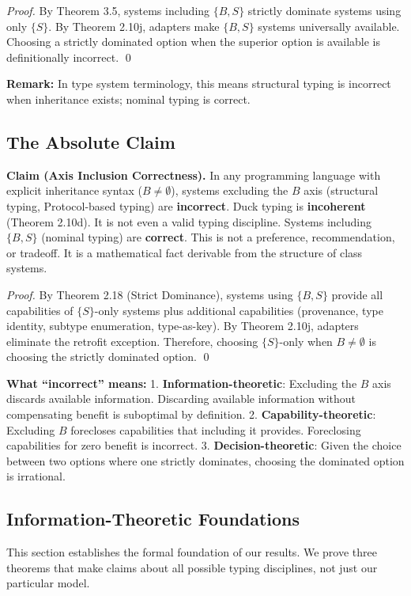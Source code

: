 \emph{Proof.} By Theorem 3.5, systems including $\{B, S\}$ strictly dominate
systems using only $\{S\}$. By Theorem 2.10j, adapters make $\{B, S\}$ systems
universally available. Choosing a strictly dominated option when the
superior option is available is definitionally incorrect.
\qed

\textbf{Remark:} In type system terminology, this means structural typing is incorrect when inheritance exists; nominal typing is correct.

\subsection{The Absolute Claim}\label{the-absolute-claim}

\textbf{Claim (Axis Inclusion Correctness).} In any programming
language with explicit inheritance syntax (\(B \neq \emptyset\)),
systems excluding the $B$ axis (structural typing, Protocol-based typing) are \textbf{incorrect}.
Duck typing is \textbf{incoherent} (Theorem 2.10d). It is not even a valid typing discipline.
Systems including $\{B, S\}$ (nominal typing) are \textbf{correct}. This
is not a preference, recommendation, or tradeoff. It is a mathematical
fact derivable from the structure of class systems.

\emph{Proof.} By Theorem 2.18 (Strict Dominance), systems using $\{B, S\}$
provide all capabilities of $\{S\}$-only systems plus additional
capabilities (provenance, type identity, subtype enumeration,
type-as-key). By Theorem 2.10j, adapters eliminate the retrofit
exception. Therefore, choosing $\{S\}$-only when
\(B \neq \emptyset\) is choosing the strictly dominated option.
\qed

\textbf{What ``incorrect'' means:} 1. \textbf{Information-theoretic}:
Excluding the $B$ axis discards available information. Discarding available
information without compensating benefit is suboptimal by definition. 2.
\textbf{Capability-theoretic}: Excluding $B$ forecloses
capabilities that including it provides. Foreclosing capabilities for
zero benefit is incorrect. 3. \textbf{Decision-theoretic}: Given the
choice between two options where one strictly dominates, choosing the
dominated option is irrational.

\subsection{Information-Theoretic
Foundations}\label{information-theoretic-foundations}

This section establishes the formal foundation of our
results. We prove three theorems that make claims about all possible
typing disciplines, not just our particular model.


